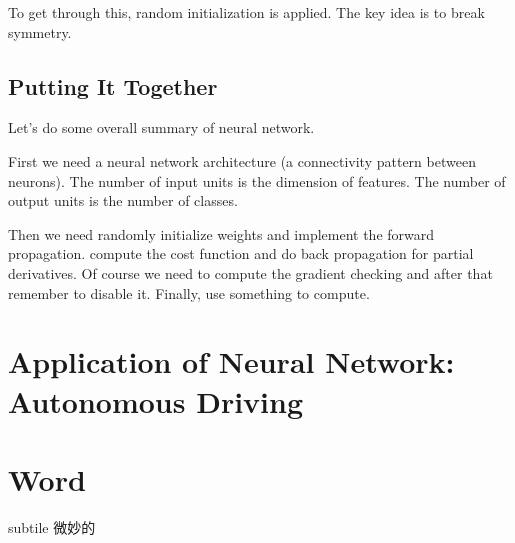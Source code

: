 \documentclass[en,11pt,english,black,simple]{../elegantbook}
\begin{document}
To get through this, random initialization is applied. The key idea is to break symmetry. 

\subsection{Putting It Together}

Let's do some overall summary of neural network.

First we need a neural network architecture (a connectivity pattern between neurons). The number of input units is the dimension of features. The number of output units is the number of classes.

Then we need randomly initialize weights and implement the forward propagation. compute the cost function and do back propagation for partial derivatives. Of course we need to compute the gradient checking and after that remember to disable it. Finally, use something to compute.



\section{Application of Neural Network: Autonomous Driving}

\section*{Word}

subtile 微妙的


\let\chapname\undefined
\ifx\mainclass\undefined
\end{document}
